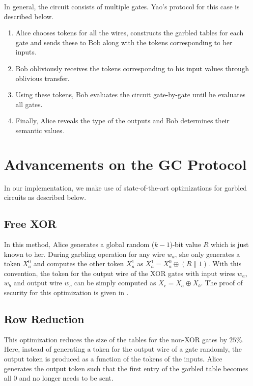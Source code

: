 In general, the circuit consists of multiple gates.
Yao's protocol for this case is described below.

\begin{enumerate}
\item
	Alice chooses tokens for all the wires, constructs the garbled tables for each gate and sends these to Bob along with the tokens corresponding to her inputs.
\item
	Bob obliviously receives the tokens corresponding to his input values through oblivious transfer.
\item
	Using these tokens, Bob evaluates the circuit gate-by-gate until he evaluates all gates.
\item
	Finally, Alice reveals the type of the outputs and Bob determines their semantic values.
\end{enumerate}

\section{Advancements on the GC Protocol}
In our implementation, we make use of state-of-the-art optimizations for garbled circuits as described below.

\subsection{Free XOR~\cite{kolesnikov2008improved}}
In this method, Alice generates a global random ($k-1$)-bit value $R$ which is just known to her.
During garbling operation for any wire $w_a$, she only generates a token $X_a^{0}$ and computes the other token $X_a^{1}$ as $X_a^{1} = X_a^{0} \oplus (R \parallel 1)$.
With this convention, the token for the output wire of the XOR gates with input wires $w_{a}$, $w_{b}$ and output wire $w_{c}$ can be simply computed as $X_{c} = X_{a} \oplus X_{b}$.
The proof of security for this optimization is given in \cite{kolesnikov2008improved}.

\subsection{Row Reduction~\cite{naor1999privacy}}
This optimization reduces the size of the tables for the non-XOR gates by $25\%$.
Here, instead of generating a token for the output wire of a gate randomly, the output token is produced as a function of the tokens of the inputs.
Alice generates the output token such that the first entry of the garbled table becomes all $0$ and no longer needs to be sent.

